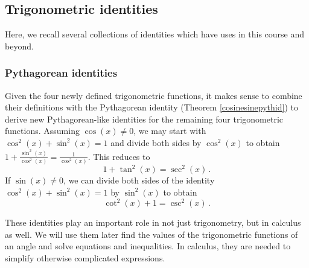\fi








\subsection{Trigonometric identities}
Here, we recall several collections of identities which have uses in this course and beyond.
\subsubsection{Pythagorean identities} 
Given the four newly defined trigonometric functions, it makes sense to combine their definitions with the Pythagorean identity (Theorem \ref{cosinesinepythid}) to derive new Pythagorean-like identities for the remaining four trigonometric functions.   Assuming $\cos(x) \neq 0$, we may start with $\cos^{2}(x) + \sin^{2}(x) = 1$ and divide both sides by $\cos^{2}(x)$ to obtain $1 + \frac{\sin^{2}(x)}{\cos^{2}(x)} = \frac{1}{\cos^{2}(x)}$.  This reduces to 
\begin{equation}
1 + \tan^{2}(x) = \sec^{2}(x)\,.
\label{pythtan}
\end{equation}  
If $\sin(x) \neq 0$, we can divide both sides of the identity $\cos^{2}(x) + \sin^{2}(x) = 1$ by $\sin^{2}(x)$ to obtain 
\begin{equation}
\cot^{2}(x) + 1 = \csc^{2}(x)\,.
\label{pythcot}
\end{equation}


These identities play an important role in not just trigonometry, but in calculus as well.  We will use them later find the values of the trigonometric functions of an angle and solve equations and inequalities.  In calculus, they are needed to simplify otherwise complicated expressions. 



